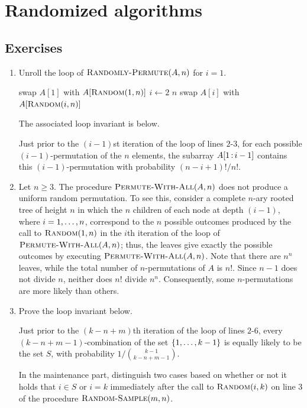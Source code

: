 \setcounter{section}{2}
\section{Randomized algorithms}
\subsection*{Exercises}
\begin{enumerate}[\thesection-1]
%
\item Unroll the \For loop of $\textnormal{\scshape Randomly-Permute}(A, n)$ for $i = 1$.
\begin{codebox}
\li swap $A[1]$ with $A[\textnormal{\scshape Random}(1, n)]$
\li \For $i \gets 2$ \To $n$
\li \Do
        swap $A[i]$ with $A[\textnormal{\scshape Random}(i, n)]$
    \End
\end{codebox}
The associated loop invariant is below.
\begin{loopinv}
Just prior to the $(i - 1)$st iteration of the \For loop of lines $2$-$3$, for each possible $(i - 1)$-permutation of the $n$ elements, the subarray $A[1 \subarr i - 1]$ contains this $(i - 1)$-permutation with probability $(n - i + 1)!/n!$.
\end{loopinv}
%
\setcounter{enumi}{2}
%
\item Let $n \geq 3$. The procedure $\textnormal{\scshape Permute-With-All}(A, n)$ does not produce a uniform random permutation. To see this, consider a complete $n$-ary rooted tree of height $n$ in which the $n$ children of each node at depth $(i - 1)$, where $i = 1, \ldots, n$, correspond to the $n$ possible outcomes produced by the call to $\textnormal{\scshape Random}(1, n)$ in the $i$th iteration of the \For loop of $\textnormal{\scshape Permute-With-All}(A, n)$; thus, the leaves give exactly the possible outcomes by executing $\textnormal{\scshape Permute-With-All}(A, n)$. Note that there are $n^n$ leaves, while the total number of $n$-permutations of $A$ is $n!$. Since $n - 1$ does not divide $n$, neither does $n!$ divide $n^n$. Consequently, some $n$-permutations are more likely than others.
%
\setcounter{enumi}{4}
%
\item Prove the loop invariant below.
\begin{loopinv}
Just prior to the $(k - n + m)$th iteration of the \For loop of lines $2$-$6$, every $(k - n + m - 1)$-combination of the set $\left\{1, \ldots, k - 1\right\}$ is equally likely to be the set $S$, with probability $1/{k - 1 \choose k - n + m - 1}$.
\end{loopinv}
In the maintenance part, distinguish two cases based on whether or not it holds that $i \in S$ or $i = k$ immediately after the call to $\textnormal{\scshape Random}(i, k)$ on line $3$ of the procedure $\textnormal{\scshape Random-Sample}(m, n)$.


\end{enumerate}
